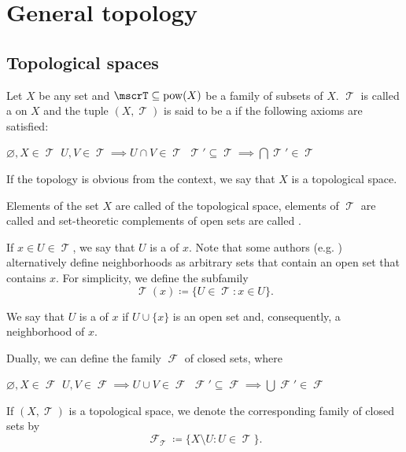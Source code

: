 \section{General topology}\label{sec:general_topology}
\subsection{Topological spaces}\label{subsec:topological_spaces}

\begin{definition}\label{def:topological_space}
  Let \( X \) be any set and \( \mscrT \subseteq \Pow(X) \) be a family of subsets of \( X \). \( \mscrT \) is called a  on \( X \) and the tuple \( (X, \mscrT) \) is said to be a  if the following axioms are satisfied:
  \begin{DefEnum}
     \( \varnothing, X \in \mscrT \)
     \( U, V \in \mscrT \implies U \cap V \in \mscrT \)
     \( \mscrT' \subseteq \mscrT \implies \bigcap \mscrT' \in \mscrT \)
  \end{DefEnum}

  If the topology is obvious from the context, we say that \( X \) is a topological space.

  Elements of the set \( X \) are called  of the topological space, elements of \( \mscrT \) are called  and set-theoretic complements of open sets are called .

  If \( x \in U \in \mscrT \), we say that \( U \) is a  of \( x \). Note that some authors (e.g. \cite[38]{Kelley1955}) alternatively define neighborhoods as arbitrary sets that contain an open set that contains \( x \). For simplicity, we define the subfamily
  \begin{equation*}
    \mscrT(x) \coloneqq \{ U \in \mscrT \colon x \in U \}.
  \end{equation*}

  We say that \( U \) is a  of \( x \) if \( U \cup \{ x \} \) is an open set and, consequently, a neighborhood of \( x \).

  Dually, we can define the family \( \mscrF \) of closed sets, where
  \begin{DefEnum}
     \( \varnothing, X \in \mscrF \)
     \( U, V \in \mscrF \implies U \cup V \in \mscrF \)
     \( \mscrF' \subseteq \mscrF \implies \bigcup \mscrF' \in \mscrF \)
  \end{DefEnum}

  If \( (X, \mscrT) \) is a topological space, we denote the corresponding family of closed sets by
  \begin{equation*}
    \mscrF_\mscrT \coloneqq \{ X \setminus U \colon U \in \mscrT \}.
  \end{equation*}
\end{definition}

